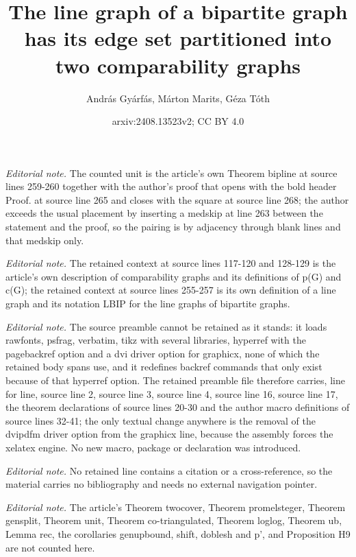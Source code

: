 \documentclass[12pt]{article}
\title{The line graph of a bipartite graph has its edge set partitioned into two comparability graphs}
\author{András Gyárfás, Márton Marits, Géza Tóth}
\date{arxiv:2408.13523v2; CC BY 4.0}
\begin{document}
\maketitle
\noindent\textit{Editorial note.} The counted unit is the article's own Theorem bipline at source lines 259-260 together with the author's proof that opens with the bold header Proof. at source line 265 and closes with the square at source line 268; the author exceeds the usual placement by inserting a medskip at line 263 between the statement and the proof, so the pairing is by adjacency through blank lines and that medskip only.\par\medskip
\noindent\textit{Editorial note.} The retained context at source lines 117-120 and 128-129 is the article's own description of comparability graphs and its definitions of p(G) and c(G); the retained context at source lines 255-257 is its own definition of a line graph and its notation LBIP for the line graphs of bipartite graphs.\par\medskip
\noindent\textit{Editorial note.} The source preamble cannot be retained as it stands: it loads rawfonts, psfrag, verbatim, tikz with several libraries, hyperref with the pagebackref option and a dvi driver option for graphicx, none of which the retained body spans use, and it redefines backref commands that only exist because of that hyperref option. The retained preamble file therefore carries, line for line, source line 2, source line 3, source line 4, source line 16, source line 17, the theorem declarations of source lines 20-30 and the author macro definitions of source lines 32-41; the only textual change anywhere is the removal of the dvipdfm driver option from the graphicx line, because the assembly forces the xelatex engine. No new macro, package or declaration was introduced.\par\medskip
\noindent\textit{Editorial note.} No retained line contains a citation or a cross-reference, so the material carries no bibliography and needs no external navigation pointer.\par\medskip
\noindent\textit{Editorial note.} The article's Theorem twocover, Theorem promelsteger, Theorem gensplit, Theorem unit, Theorem co-triangulated, Theorem loglog, Theorem ub, Lemma rec, the corollaries genupbound, shift, doblesh and p', and Proposition H9 are not counted here.\par\medskip
\end{document}
